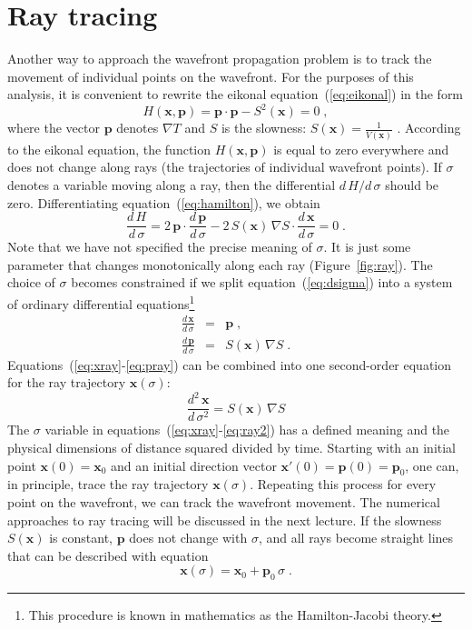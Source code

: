 \section{Ray tracing}
Another way to approach the wavefront propagation problem is to track
the movement of individual points on the wavefront. For the purposes
of this analysis, it is convenient to rewrite the eikonal
equation~(\ref{eq:eikonal}) in the form
\begin{equation}
  \label{eq:hamilton}
  H(\mathbf{x},\mathbf{p}) = \mathbf{p} \cdot \mathbf{p} - 
  S^2(\mathbf{x}) = 0\;,
\end{equation}
where the vector $\mathbf{p}$ denotes $\nabla T$ and $S$ is
the slowness: $S(\mathbf{x}) = \frac{1}{V(\mathbf{x})}$ . According to
the eikonal equation, the function $H(\mathbf{x},\mathbf{p})$ is equal
to zero everywhere and does not change along rays (the trajectories of
individual wavefront points). If $\sigma$ denotes a variable moving
along a ray, then the differential $d\,H/d\,\sigma$ should be
zero. Differentiating equation~(\ref{eq:hamilton}), we obtain
\begin{equation}
  \label{eq:dsigma}
  \frac{d\,H}{d\,\sigma} = 
  2\,\mathbf{p} \cdot \frac{d\,\mathbf{p}}{d\,\sigma} -
  2\,S(\mathbf{x})\,\nabla S \cdot \frac{d\,\mathbf{x}}{d\,\sigma} = 0\;.
\end{equation}
Note that we have not specified the precise meaning of $\sigma$. It
is just some parameter that changes monotonically along each ray
(Figure~\ref{fig:ray}). The choice of $\sigma$ becomes constrained if
we split equation~(\ref{eq:dsigma}) into a system of ordinary
differential equations\footnote{This procedure is known in mathematics
as the Hamilton-Jacobi theory.}
\begin{eqnarray}
  \label{eq:xray}
  \frac{d\,\mathbf{x}}{d\,\sigma} & = & \mathbf{p}\;, \\
  \label{eq:pray}
  \frac{d\,\mathbf{p}}{d\,\sigma} & = & S(\mathbf{x})\,\nabla S\;.
\end{eqnarray}
Equations~(\ref{eq:xray}-\ref{eq:pray}) can be combined into one
second-order equation for the ray trajectory $\mathbf{x}(\sigma)$:
\begin{equation}
  \label{eq:ray2}
  \frac{d^2\,\mathbf{x}}{d\,\sigma^2} =  S(\mathbf{x})\,\nabla S
\end{equation}
The $\sigma$ variable in equations~(\ref{eq:xray}-\ref{eq:ray2}) has a defined
meaning and the physical dimensions of distance squared divided by time.
Starting with an initial point $\mathbf{x}(0)=\mathbf{x}_0$ and an initial
direction vector $\mathbf{x}'(0)=\mathbf{p}(0)=\mathbf{p}_0$, one can, in
principle, trace the ray trajectory $\mathbf{x}(\sigma)$. Repeating this
process for every point on the wavefront, we can track the wavefront movement.
The numerical approaches to ray tracing will be discussed in the next lecture.
If the slowness $S(\mathbf{x})$ is constant, $\mathbf{p}$ does not change with
$\sigma$, and all rays become straight lines that can be described with 
equation
\begin{equation}
  \label{eq:straight}
  \mathbf{x}(\sigma) = \mathbf{x}_0 + \mathbf{p}_0\,\sigma\;.
\end{equation}

